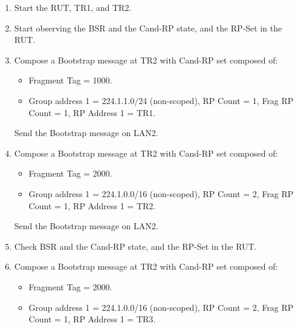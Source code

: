 \documentclass[11pt]{report}
\begin{document}

\begin{enumerate}

  \item Start the RUT, TR1, and TR2.

  \item Start observing the BSR and the Cand-RP state, and the RP-Set in the
  RUT.

  \item Compose a Bootstrap message at TR2 with Cand-RP set composed of:

  \begin{itemize}

    \item Fragment Tag = 1000.

    \item Group address 1 = 224.1.1.0/24 (non-scoped),
    RP Count = 1, Frag RP Count = 1, RP Address 1 = TR1.

  \end{itemize}

  Send the Bootstrap message on LAN2.

  \item Compose a Bootstrap message at TR2 with Cand-RP set composed of:

  \begin{itemize}

    \item Fragment Tag = 2000.

    \item Group address 1 = 224.1.0.0/16 (non-scoped),
    RP Count = 2, Frag RP Count = 1, RP Address 1 = TR2.

  \end{itemize}

  Send the Bootstrap message on LAN2.

  \item Check BSR and the Cand-RP state, and the RP-Set in the RUT.

  \item Compose a Bootstrap message at TR2 with Cand-RP set composed of:

  \begin{itemize}

    \item Fragment Tag = 2000.

    \item Group address 1 = 224.1.0.0/16 (non-scoped),
    RP Count = 2, Frag RP Count = 1, RP Address 1 = TR3.


\end{itemize}
\end{enumerate}
\end{document}
